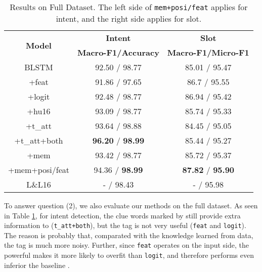 \begin{table}
\setlength{\tabcolsep}{0.23em}
\centering
\small{
\begin{tabular}{|c|c|c|}

\hline
\multirow{2}{*}{\textbf{Model}} & \textbf{Intent} & \textbf{Slot} \\
\cline{2-3}
  & \textbf{Macro-F1/Accuracy} &  \textbf{Macro-F1/Micro-F1} \\
\hline
BLSTM & 92.50 / 98.77  & 85.01 / 95.47\\
\hline
+feat & 91.86 / 97.65 & 86.7 / 95.55\\
\hline
+logit & 92.48 / 98.77 & 86.94 / 95.42  \\
\hline
+hu16 & 93.09 / 98.77 & 85.74 / 95.33  \\
\hline
+t\_att & 93.64 / 98.88  & 84.45 / 95.05\\
\hline
+t\_att+both & \textbf{96.20} / \textbf{98.99} & 85.44 / 95.27 \\
\hline
+mem & 93.42 / 98.77 & 85.72 / 95.37\\
\hline
+mem+posi/feat & 94.36 / \textbf{98.99} & \textbf{87.82} / \textbf{95.90} \\
\hline
\hline
L\&L16 & - / 98.43 & - / 95.98\\
\hline

\end{tabular}
}
\caption{Results on Full Dataset. The left side of \texttt{mem+posi/feat} applies for intent, and the right side applies for slot.}
\label{tab_full}
\end{table}

To answer question (2), we also evaluate our methods on the full dataset.
As seen in Table \ref{tab_full}, for intent detection,
the clue words marked by \RE still provide extra information to \NN (\texttt{t\_att+both}),
but the \RE tag is not very useful (\texttt{feat} and \texttt{logit}).
The reason is probably that, comparated with the knowledge learned from data, the \RE tag is much more noisy.
Further, since \texttt{feat} operates on the input side, the powerful \NN makes it more likely to overfit than \texttt{logit}, and therefore performs even inferior the baseline \BLSTM.

